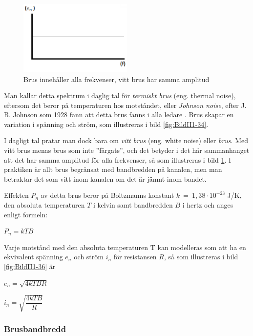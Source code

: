 \begin{figure}
\includegraphics[width=0.5\textwidth]{images/cropped_pdfs/bild_2_1-35.pdf}
\caption{Brus innehåller alla frekvenser, vitt brus har samma amplitud}
\label{fig:BildII1-35}
\end{figure}

Man kallar detta spektrum i daglig tal för \emph{termiskt brus}
(eng. thermal noise), eftersom det beror på temperaturen hos motståndet, eller
\emph{Johnson noise}, efter J. B. Johnson som 1928 fann att detta brus fanns
i alla ledare \cite{ott1988}.
Brus skapar en variation i spänning och ström, som illustreras i bild
\ref{fig:BildII1-34}.

I dagligt tal pratar man dock bara om \emph{vitt brus} (eng. white noise) eller
\emph{brus}.
Med vitt brus menas brus som inte ''färgats'', och det betyder i det här
sammanhanget att det har samma amplitud för alla frekvenser, så som illustreras
i bild \ref{fig:BildII1-35}.
I praktiken är allt brus begränsat med bandbredden på kanalen, men man
betraktar det som vitt inom kanalen om det är jämnt inom bandet.

Effekten \(P_n\) av detta brus beror på Boltzmanns konstant
\(k\ =\ 1,38 \cdot 10^{-23}\) J/K, den absoluta temperaturen \(T\) i
kelvin samt bandbredden \(B\) i hertz och anges enligt formeln:

\(P_n = k T B\)

Varje motstånd med den absoluta temperaturen T kan modelleras som att ha en
ekvivalent spänning \(e_n\) och ström \(i_n\) för resistansen \(R\),
så som illustreras i bild \ref{fig:BildII1-36} är

\(e_n = \sqrt{4kTBR}\)

\(i_n = \sqrt{\dfrac{4kTB}{R}}\)

\subsubsection{Brusbandbredd}

